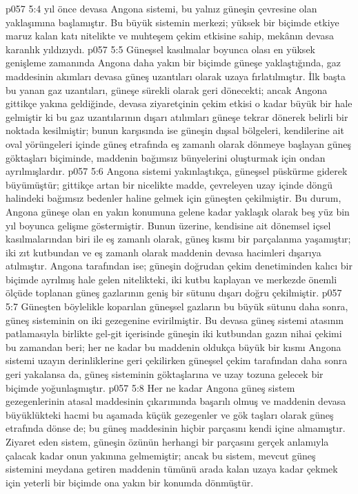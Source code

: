 \vs p057 5:4  yıl önce devasa Angona sistemi, bu yalnız güneşin çevresine olan yaklaşımına başlamıştır. Bu büyük sistemin merkezi; yüksek bir biçimde etkiye maruz kalan katı nitelikte ve muhteşem çekim etkisine sahip, mekânın devasa karanlık yıldızıydı.
\vs p057 5:5 Güneşsel kasılmalar boyunca olası en yüksek genişleme zamanında Angona daha yakın bir biçimde güneşe yaklaştığında, gaz maddesinin akımları devasa güneş uzantıları olarak uzaya fırlatılmıştır. İlk başta bu yanan gaz uzantıları, güneşe sürekli olarak geri dönecekti; ancak Angona gittikçe yakına geldiğinde, devasa ziyaretçinin çekim etkisi o kadar büyük bir hale gelmiştir ki bu gaz uzantılarının dışarı atılımları güneşe tekrar dönerek belirli bir noktada kesilmiştir; bunun karşısında ise güneşin dışsal bölgeleri, kendilerine ait oval yörüngeleri içinde güneş etrafında eş zamanlı olarak dönmeye başlayan güneş göktaşları biçiminde, maddenin bağımsız bünyelerini oluşturmak için ondan ayrılmışlardır.
\vs p057 5:6 Angona sistemi yakınlaştıkça, güneşsel püskürme giderek büyümüştür; gittikçe artan bir nicelikte madde, çevreleyen uzay içinde döngü halindeki bağımsız bedenler haline gelmek için güneşten çekilmiştir. Bu durum, Angona güneşe olan en yakın konumuna gelene kadar yaklaşık olarak beş yüz bin yıl boyunca gelişme göstermiştir. Bunun üzerine, kendisine ait dönemsel içsel kasılmalarından biri ile eş zamanlı olarak, güneş kısmı bir parçalanma yaşamıştır; iki zıt kutbundan ve eş zamanlı olarak maddenin devasa hacimleri dışarıya atılmıştır. Angona tarafından ise; güneşin doğrudan çekim denetiminden kalıcı bir biçimde ayrılmış hale gelen nitelikteki, iki kutbu kaplayan ve merkezde önemli ölçüde toplanan güneş gazlarının geniş bir sütunu dışarı doğru çekilmiştir.
\vs p057 5:7 Güneşten böylelikle koparılan güneşsel gazların bu büyük sütunu daha sonra, güneş sisteminin on iki gezegenine evirilmiştir. Bu devasa güneş sistemi atasının patlamasıyla birlikte gel\hyp{}git içerisinde güneşin iki kutbundan gazın nihai çekimi bu zamandan beri; her ne kadar bu maddenin oldukça büyük bir kısmı Angona sistemi uzayın derinliklerine geri çekilirken güneşsel çekim tarafından daha sonra geri yakalansa da, güneş sisteminin göktaşlarına ve uzay tozuna gelecek bir biçimde yoğunlaşmıştır.
\vs p057 5:8 Her ne kadar Angona güneş sistem gezegenlerinin atasal maddesinin çıkarımında başarılı olmuş ve maddenin devasa büyüklükteki hacmi bu aşamada küçük gezegenler ve gök taşları olarak güneş etrafında dönse de; bu güneş maddesinin hiçbir parçasını kendi içine almamıştır. Ziyaret eden sistem, güneşin özünün herhangi bir parçasını gerçek anlamıyla çalacak kadar onun yakınına gelmemiştir; ancak bu sistem, mevcut güneş sistemini meydana getiren maddenin tümünü arada kalan uzaya kadar çekmek için yeterli bir biçimde ona yakın bir konumda dönmüştür.

